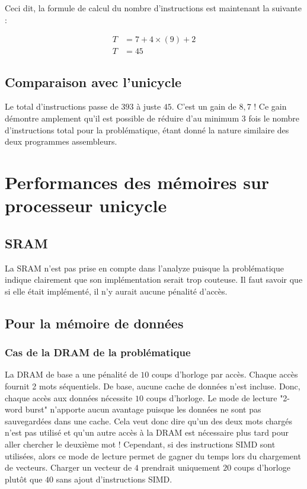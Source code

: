 \documentclass[a11paper]{article}
\newcommand{\todo}[1]{\begin{color}{Red}\textbf{TODO:} #1\end{color}}
\begin{document}
Ceci dit, la formule de calcul du nombre d'instructions est maintenant la
suivante :

\begin{align}
  T &= 7 + 4\times(9) + 2 \\
  T &= 45
\end{align}

\subsection{Comparaison avec l'unicycle}

Le total d'instructions passe de $393$ à juste $45$. C'est un gain de $8{,}7$ !
Ce gain démontre amplement qu'il est possible de réduire d'au minimum $3$ fois
le nombre d'instructions total pour la problématique, étant donné la nature
similaire des deux programmes assembleurs.






\section{Performances des mémoires sur processeur unicycle}

\subsection{SRAM}
La SRAM n'est pas prise en compte dans l'analyze puisque la problématique
indique clairement que son implémentation serait trop couteuse. Il faut
savoir que si elle était implémenté, il n'y aurait aucune pénalité d'accès.

\subsection{Pour la mémoire de données}

\subsubsection{Cas de la DRAM de la problématique}

La DRAM de base a une pénalité de $10$ coups d'horloge par accès. Chaque accès
fournit 2 mots séquentiels. De base, aucune cache de données n’est incluse.
Donc, chaque accès aux données nécessite $10$ coups d'horloge. Le mode de
lecture "2-word burst" n’apporte aucun avantage puisque les données ne sont pas
sauvegardées dans une cache. Cela veut donc dire qu’un des deux mots chargés
n’est pas utilisé et qu’un autre accès à la DRAM est nécessaire plus tard pour
aller chercher le deuxième mot ! Cependant, si des instructions SIMD sont
utilisées, alors ce mode de lecture permet de gagner du temps lors du
chargement de vecteurs. Charger un vecteur de $4$ prendrait uniquement $20$
coups d’horloge plutôt que $40$ sans ajout d’instructions SIMD.
\end{document}
